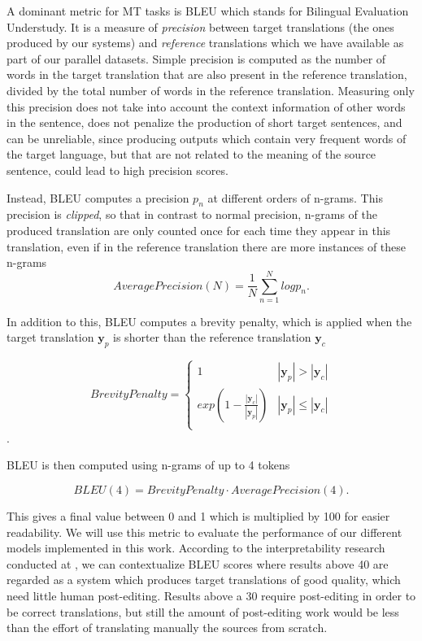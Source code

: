 \documentclass[11pt,english,listoffigures,listoftables]{tfgetsinf}
\newcommand{\vect}[1]{\mathbf{#1}}
\begin{document}
A dominant metric for MT tasks is BLEU \cite{papineni-etal-2002-bleu} which stands for Bilingual Evaluation Understudy. It is a measure of \textit{precision} between target translations (the ones produced by our systems) and \textit{reference} translations which we have available as part of our parallel datasets. 
Simple precision is computed as the number of words in the target translation that are also present in the reference translation, divided by the total number of words in the reference translation. 
Measuring only this precision does not take into account the context information of other words in the sentence, does not penalize the production of short target sentences, and can be unreliable, since producing outputs which contain very frequent words of the target language, but that are not related to the meaning of the source sentence, could lead to high precision scores.

Instead, BLEU computes a precision $p_n$ at different orders of n-grams. This precision is \textit{clipped}, so that in contrast to normal precision, n-grams of the produced translation are only counted once for each time they appear in this translation, even if in the reference translation there are more instances of these n-grams 
\begin{equation}
    AveragePrecision(N) = \frac{1}{N} \sum_{n=1}^Nlogp_n.
\end{equation}

In addition to this, BLEU computes a brevity penalty, which is applied when the target translation $\vect{y}_p$ is shorter than the reference translation $\vect{y}_c$

\begin{equation}
BrevityPenalty=
\begin{cases}
1 & |\vect{y}_p| > |\vect{y}_c| \\
exp(1-\frac{|\vect{y}_c|}{|\vect{y}_p|}) & |\vect{y}_p| \leq |\vect{y}_c| \\ 
\end{cases}
\end{equation}.

BLEU is then computed using n-grams of up to 4 tokens

\begin{equation}
    BLEU(4) = BrevityPenalty \cdot AveragePrecision(4).
\end{equation}

This gives a final value between 0 and 1 which is multiplied by 100 for easier readability. We will use this metric to evaluate the performance of our different models implemented in this work. According to the interpretability research conducted at \cite{specia-etal-2009-improving}, we can contextualize BLEU scores where results above 40 are regarded as a system which produces target translations of good quality, which need little human post-editing. Results above a 30 require post-editing in order to be correct translations, but still the amount of post-editing work would be less than the effort of translating manually the sources from scratch. 
\end{document}

